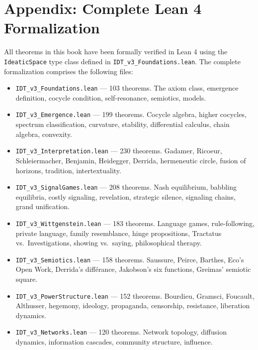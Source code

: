 \documentclass[11pt,oneside]{book}
\theoremstyle{plain}
\theoremstyle{definition}
\theoremstyle{remark}
\begin{document}
\chapter*{Appendix: Complete Lean 4 Formalization}

All theorems in this book have been formally verified in Lean 4 using the
\texttt{IdeaticSpace} type class defined in \texttt{IDT\_v3\_Foundations.lean}.
The complete formalization comprises the following files:

\begin{itemize}
\item \texttt{IDT\_v3\_Foundations.lean} --- 103 theorems. The axiom class,
emergence definition, cocycle condition, self-resonance, semiotics, models.

\item \texttt{IDT\_v3\_Emergence.lean} --- 199 theorems. Cocycle algebra,
higher cocycles, spectrum classification, curvature, stability, differential
calculus, chain algebra, convexity.

\item \texttt{IDT\_v3\_Interpretation.lean} --- 230 theorems. Gadamer,
Ricoeur, Schleiermacher, Benjamin, Heidegger, Derrida, hermeneutic circle,
fusion of horizons, tradition, intertextuality.

\item \texttt{IDT\_v3\_SignalGames.lean} --- 208 theorems. Nash equilibrium,
babbling equilibria, costly signaling, revelation, strategic silence,
signaling chains, grand unification.

\item \texttt{IDT\_v3\_Wittgenstein.lean} --- 183 theorems. Language games,
rule-following, private language, family resemblance, hinge propositions,
Tractatus vs.\ Investigations, showing vs.\ saying, philosophical therapy.

\item \texttt{IDT\_v3\_Semiotics.lean} --- 158 theorems. Saussure, Peirce,
Barthes, Eco's Open Work, Derrida's diff\'erance, Jakobson's six functions,
Greimas' semiotic square.

\item \texttt{IDT\_v3\_PowerStructure.lean} --- 152 theorems. Bourdieu,
Gramsci, Foucault, Althusser, hegemony, ideology, propaganda, censorship,
resistance, liberation dynamics.

\item \texttt{IDT\_v3\_Networks.lean} --- 120 theorems. Network topology,
diffusion dynamics, information cascades, community structure, influence.


\end{itemize}
\end{document}
